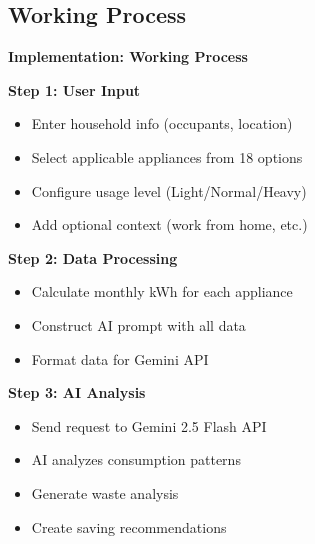 \documentclass[11pt,aspectratio=169,notes,mathserif]{beamer}
\begin{document}
\subsection{Working Process}
\begin{frame}{\textbf{Implementation: Working Process}}
    \justifying
    
    \begin{block}{\textbf{Step 1: User Input}}
        \begin{itemize}
            \item Enter household info (occupants, location)
            \item Select applicable appliances from 18 options
            \item Configure usage level (Light/Normal/Heavy)
            \item Add optional context (work from home, etc.)
        \end{itemize}
    \end{block}
    
    \begin{block}{\textbf{Step 2: Data Processing}}
        \begin{itemize}
            \item Calculate monthly kWh for each appliance
            \item Construct AI prompt with all data
            \item Format data for Gemini API
        \end{itemize}
    \end{block}
    
    \begin{block}{\textbf{Step 3: AI Analysis}}
        \begin{itemize}
            \item Send request to Gemini 2.5 Flash API
            \item AI analyzes consumption patterns
            \item Generate waste analysis
            \item Create saving recommendations
        \end{itemize}
    \end{block}
\end{frame}
\end{document}
